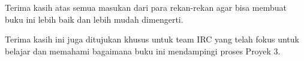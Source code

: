 Terima kasih atas semua masukan dari para rekan-rekan agar bisa membuat buku ini 
lebih baik dan lebih mudah dimengerti.

Terima kasih ini juga ditujukan khusus untuk team IRC yang 
telah fokus untuk belajar dan memahami bagaimana buku ini mendampingi proses 
Proyek 3.

